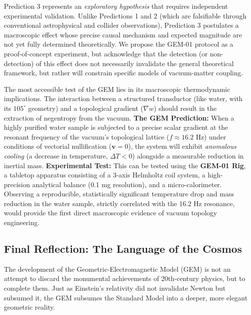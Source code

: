 \begin{remark}
Prediction 3 represents an \textit{exploratory hypothesis} that requires independent experimental validation. Unlike Predictions 1 and 2 (which are falsifiable through conventional astrophysical and collider observations), Prediction 3 postulates a macroscopic effect whose precise causal mechanism and expected magnitude are not yet fully determined theoretically. We propose the GEM-01 protocol as a proof-of-concept experiment, but acknowledge that the detection (or non-detection) of this effect does not necessarily invalidate the general theoretical framework, but rather will constrain specific models of vacuum-matter coupling.
\end{remark}
The most accessible test of the GEM lies in its macroscopic thermodynamic implications. The interaction between a structured transductor (like water, with its $105^\circ$ geometry) and a topological gradient ($\nabla w$) should result in the extraction of negentropy from the vacuum.
\textbf{The GEM Prediction:} When a highly purified water sample is subjected to a precise scalar gradient at the resonant frequency of the vacuum's topological lattice ($f \approx 16.2$ Hz) under conditions of vectorial nullification ($\mathbf{v}=0$), the system will exhibit \textit{anomalous cooling} (a decrease in temperature, $\Delta T < 0$) alongside a measurable reduction in inertial mass.
\textbf{Experimental Test:} This can be tested using the \textbf{GEM-01 Rig}, a tabletop apparatus consisting of a 3-axis Helmholtz coil system, a high-precision analytical balance (0.1 mg resolution), and a micro-calorimeter. Observing a reproducible, statistically significant temperature drop and mass reduction in the water sample, strictly correlated with the 16.2 Hz resonance, would provide the first direct macroscopic evidence of vacuum topology engineering.

\subsection{Final Reflection: The Language of the Cosmos}

The development of the Geometric-Electromagnetic Model (GEM) is not an attempt to discard the monumental achievements of 20th-century physics, but to complete them. Just as Einstein's relativity did not invalidate Newton but subsumed it, the GEM subsumes the Standard Model into a deeper, more elegant geometric reality.

